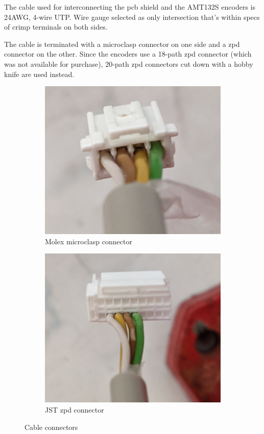\documentclass[twoside]{article}
\begin{document}
The cable used for interconnecting the pcb shield and the AMT132S encoders is 24AWG, 4-wire UTP. Wire gauge selected as only intersection that's within specs of crimp terminals on both sides.

The cable is terminated with a microclasp connector on one side and a zpd connector on the other. Since the encoders use a 18-path zpd connector (which was not available for purchase), 20-path zpd connectors cut down with a hobby knife are used instead.

\begin{figure}[h!]
	\centering
	\begin{subfigure}[b]{0.45\textwidth}
		\includegraphics[width=\textwidth]{figs/conn_molex.jpg}
		\caption{Molex microclasp connector}
		\label{fig:molex}
	\end{subfigure}
	\begin{subfigure}[b]{0.45\textwidth}
		\includegraphics[width=\textwidth]{figs/conn_jst.jpg}
		\caption{JST zpd connector}
		\label{fig:jst}
	\end{subfigure}
	\caption{Cable connectors}
	\label{fig:JpgEpsCompare}
\end{figure}
\end{document}
